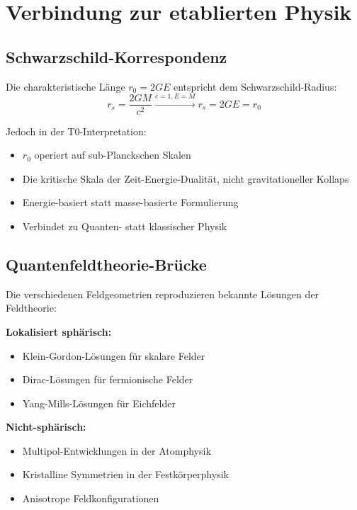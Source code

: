 \documentclass[12pt,a4paper]{report}
\newcommand{\rzero}{r_0}                  %
\begin{document}
	\section{Verbindung zur etablierten Physik}
	\label{sec:connection_established}
	
	\subsection{Schwarzschild-Korrespondenz}
	\label{subsec:schwarzschild_correspondence}
	
	Die charakteristische Länge $\rzero = 2GE$ entspricht dem Schwarzschild-Radius:
	\begin{equation}
		r_s = \frac{2GM}{c^2} \xrightarrow{c=1, E=M} r_s = 2GE = \rzero
	\end{equation}
	
	Jedoch in der T0-Interpretation:
	\begin{itemize}
		\item $\rzero$ operiert auf sub-Planckschen Skalen
		\item Die kritische Skala der Zeit-Energie-Dualität, nicht gravitationeller Kollaps
		\item Energie-basiert statt masse-basierte Formulierung
		\item Verbindet zu Quanten- statt klassischer Physik
	\end{itemize}
	
	\subsection{Quantenfeldtheorie-Brücke}
	\label{subsec:qft_bridge}
	
	Die verschiedenen Feldgeometrien reproduzieren bekannte Lösungen der Feldtheorie:
	
	\textbf{Lokalisiert sphärisch:} 
	\begin{itemize}
		\item Klein-Gordon-Lösungen für skalare Felder
		\item Dirac-Lösungen für fermionische Felder
		\item Yang-Mills-Lösungen für Eichfelder
	\end{itemize}
	
	\textbf{Nicht-sphärisch:}
	\begin{itemize}
		\item Multipol-Entwicklungen in der Atomphysik
		\item Kristalline Symmetrien in der Festkörperphysik
		\item Anisotrope Feldkonfigurationen
	\end{itemize}
	
\end{document}
